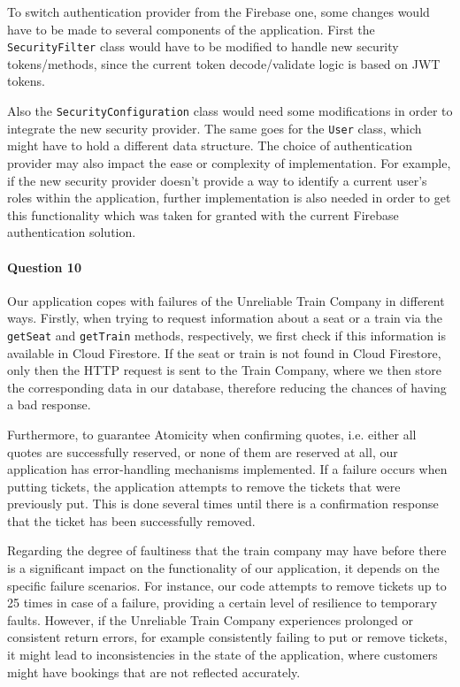 \documentclass{ds-report}
\begin{document}
To switch authentication provider from the Firebase one, some changes would have to be made to several components of
the application. First the \texttt{SecurityFilter} class would have to be modified to handle new security tokens/methods, since the current token decode/validate logic is based on JWT tokens.

Also the \texttt{SecurityConfiguration} class would need some modifications in order to integrate the new security provider. The same goes for the \texttt{User} class, which might have to hold a different data structure. The choice of authentication provider may also impact the ease or complexity of implementation. For example, if the new security provider doesn't provide a way to identify a current user's roles within the application, further implementation is also needed in order to get this functionality which was taken for granted with the current Firebase authentication solution.

    \paragraph{Question 10}
Our application copes with failures of the Unreliable Train Company in different ways. Firstly, when trying to request information about a seat or a train via the \texttt{getSeat} and \texttt{getTrain} methods, respectively, we first check if this information is available in Cloud Firestore. If the seat or train is not found in Cloud Firestore, only then the HTTP request is sent to the Train Company, where we then store the corresponding data in our database, therefore reducing the chances of having a bad response.

Furthermore, to guarantee Atomicity when confirming quotes, i.e. either all quotes are successfully reserved, or none of them are reserved at all, our application has error-handling mechanisms implemented. If a failure occurs when putting tickets, the application attempts to remove the tickets that were previously put. This is done several times until there is a confirmation response that the ticket has been successfully removed.

Regarding the degree of faultiness that the train company may have before there is a significant impact on the functionality of our application, it depends on the specific failure scenarios. For instance, our code attempts to remove tickets up to 25 times in case of a failure, providing a certain level of resilience to temporary faults. However, if the Unreliable Train Company experiences prolonged or consistent return errors, for example consistently failing to put or remove tickets, it might lead to inconsistencies in the state of the application, where customers might have bookings that are not reflected accurately.
    
\end{document}
